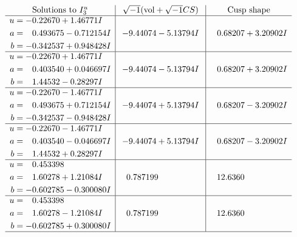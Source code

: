 \documentclass[1p]{elsarticle_modified}
\theoremstyle{definition}
\newcommand{\I}{\sqrt{-1}}
\begin{document}
$$\begin{array}{c|c|c}  
\text{Solutions to }I^u_{3}& \I (\text{vol} + \sqrt{-1}CS) & \text{Cusp shape}\\
 \hline 
\begin{aligned}
u &= -0.22670 + 1.46771 I \\
a &= \phantom{-}0.493675 - 0.712154 I \\
b &= -0.342537 + 0.948428 I\end{aligned}
 & -9.44074 - 5.13794 I & \phantom{-}0.68207 + 3.20902 I \\ \hline\begin{aligned}
u &= -0.22670 + 1.46771 I \\
a &= \phantom{-}0.403540 + 0.046697 I \\
b &= \phantom{-}1.44532 - 0.28297 I\end{aligned}
 & -9.44074 - 5.13794 I & \phantom{-}0.68207 + 3.20902 I \\ \hline\begin{aligned}
u &= -0.22670 - 1.46771 I \\
a &= \phantom{-}0.493675 + 0.712154 I \\
b &= -0.342537 - 0.948428 I\end{aligned}
 & -9.44074 + 5.13794 I & \phantom{-}0.68207 - 3.20902 I \\ \hline\begin{aligned}
u &= -0.22670 - 1.46771 I \\
a &= \phantom{-}0.403540 - 0.046697 I \\
b &= \phantom{-}1.44532 + 0.28297 I\end{aligned}
 & -9.44074 + 5.13794 I & \phantom{-}0.68207 - 3.20902 I \\ \hline\begin{aligned}
u &= \phantom{-}0.453398\phantom{ +0.000000I} \\
a &= \phantom{-}1.60278 + 1.21084 I \\
b &= -0.602785 - 0.300080 I\end{aligned}
 & \phantom{-}0.787199\phantom{ +0.000000I} & \phantom{-}12.6360\phantom{ +0.000000I} \\ \hline\begin{aligned}
u &= \phantom{-}0.453398\phantom{ +0.000000I} \\
a &= \phantom{-}1.60278 - 1.21084 I \\
b &= -0.602785 + 0.300080 I\end{aligned}
 & \phantom{-}0.787199\phantom{ +0.000000I} & \phantom{-}12.6360\phantom{ +0.000000I}\\
 \hline 
 \end{array}$$\newpage\newpage\renewcommand{\arraystretch}{1}
\end{document}
